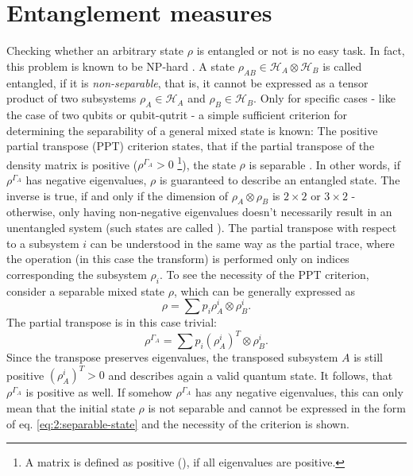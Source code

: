 \section{Entanglement measures}\label{sec:2:entanglement-measures}
Checking whether an arbitrary state $\rho$ is entangled or not is no easy task. In fact, this problem is known to be NP-hard \cite{Gurvits_2003}.
A state $\rho_{AB} \in \mathcal{H}_A\otimes\mathcal{H}_B$ is called entangled, if it is \emph{non-separable}, that is, it cannot be expressed as a tensor product of two subsystems $\rho_A \in \mathcal{H}_A$ and $\rho_B \in \mathcal{H}_B$.
Only for specific cases - like the case of two qubits or qubit-qutrit - a simple sufficient criterion for determining the separability of a general mixed state is known:
The positive partial transpose (PPT) criterion states, that if the partial transpose of the density matrix is positive ($\rho^{\Gamma_A} > 0$ \footnote{A matrix is defined as positive (), if all eigenvalues are positive.}), the state $\rho$ is separable \cite{Horodecki_2009,Plenio_2005a}. In other words, if $\rho^{\Gamma_A}$ has negative eigenvalues, $\rho$ is guaranteed to describe an entangled state.
The inverse is true, if and only if the dimension of $\rho_A\otimes\rho_B$ is $2\times2$ or $3\times2$ \cite{Horodecki_2009} - otherwise, only having non-negative eigenvalues doesn't necessarily result in an unentangled system (such states are called ).
The partial transpose with respect to a subsystem $i$ can be understood in the same way as the partial trace, where the operation (in this case the transform) is performed only on indices corresponding the subsystem $\rho_i$.
To see the necessity of the PPT criterion, consider a separable mixed state $\rho$, which can be generally expressed as 
\begin{equation}\label{eq:2:separable-state}
  \rho = \sum p_i \rho_{A}^i\otimes\rho_{B}^i .
\end{equation}
The partial transpose is in this case trivial:
\begin{equation}
  \rho^{\Gamma_A} = \sum p_i (\rho_{A}^i)^T \otimes \rho_{B}^i .
\end{equation}
Since the transpose preserves eigenvalues, the transposed subsystem $A$ is still positive $(\rho_{A}^i)^T > 0$ and describes again a valid quantum state. It follows, that $\rho^{\Gamma_A}$ is positive as well.
If somehow $\rho^{\Gamma_A}$ has any negative eigenvalues, this can only mean that the initial state $\rho$ is not separable and cannot be expressed in the form of eq. \eqref{eq:2:separable-state} and the necessity of the criterion is shown.

